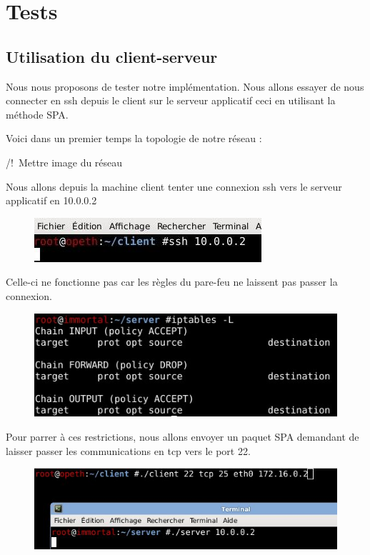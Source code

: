 \chapter{Tests}

\section{Utilisation du client-serveur}

Nous nous proposons de tester notre implémentation. Nous allons essayer de nous connecter en ssh depuis le client sur le serveur applicatif ceci en utilisant la méthode SPA.

Voici dans un premier temps la topologie de notre réseau :

/!\ Mettre image du réseau

Nous allons depuis la machine client tenter une connexion ssh vers le serveur applicatif en 10.0.0.2

\begin{figure}[h]

\centerline{\includegraphics[scale=0.75]{test_ssh.jpeg}}

\end{figure}

Celle-ci ne fonctionne pas car les règles du pare-feu ne laissent pas passer la connexion.

\begin{figure}[h]

\centerline{\includegraphics[scale=0.6]{regles_ip_avant}}

\end{figure}

Pour parrer à ces restrictions, nous allons envoyer un paquet SPA demandant de laisser passer les communications en tcp vers le port 22.

\begin{figure}[h]

\centerline{\includegraphics[scale=0.6]{execution_client.jpeg}}

\end{figure}

